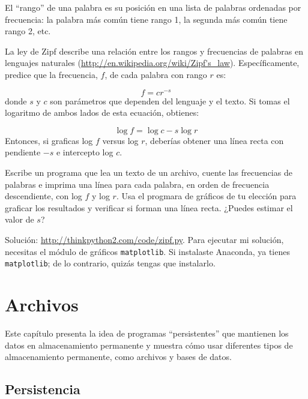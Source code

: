 \documentclass[10pt]{book}
\begin{document}
\begin{exercise}

El ``rango'' de una palabra es su posición en una lista de palabras
ordenadas por frecuencia: la palabra más común tiene rango 1, la
segunda más común tiene rango 2, etc.

La ley de Zipf describe una relación entre los rangos y frecuencias de
palabras en lenguajes naturales
(\url{http://en.wikipedia.org/wiki/Zipf's_law}).  Específicamente,
predice que la frecuencia, $f$, de cada palabra con rango $r$ es:

\[ f = c r^{-s} \]
%
donde $s$ y $c$ son parámetros que dependen del lenguaje y el
texto.  Si tomas el logaritmo de ambos lados de esta ecuación,
obtienes:

\[ \log f = \log c - s \log r \]
%
Entonces, si graficas log $f$ versus log $r$, deberías obtener
una línea recta con pendiente $-s$ e intercepto log $c$.

Escribe un programa que lea un texto de un archivo, cuente
las frecuencias de palabras e imprima una línea
para cada palabra, en orden de frecuencia descendiente, con
log $f$ y log $r$.  Usa el progmara de gráficos de tu
elección para graficar los resultados y verificar si forman
una línea recta.  ¿Puedes estimar el valor de $s$?

Solución: \url{http://thinkpython2.com/code/zipf.py}.
Para ejecutar mi solución, necesitas el módulo de gráficos {\tt matplotlib}.
Si instalaste Anaconda, ya tienes {\tt matplotlib};
de lo contrario, quizás tengas que instalarlo.

\end{exercise}



\chapter{Archivos}

Este capítulo presenta la idea de programas ``persistentes'' que
mantienen los datos en almacenamiento permanente y muestra cómo usar diferentes
tipos de almacenamiento permanente, como archivos y bases de datos.


\section{Persistencia}
\end{document}
